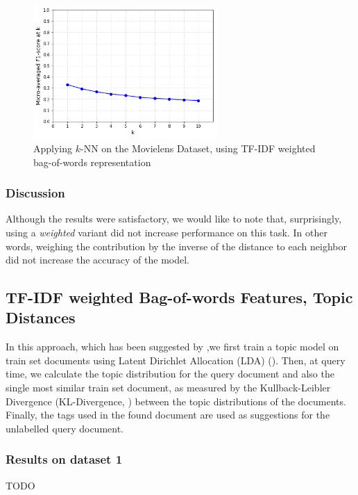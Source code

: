 \begin{figure}[H]
    \centering
    \includegraphics[width=7cm]{chapters/05_experiments/images/knn-tfidf-movielens.png}
    \caption{Applying $k$-NN on the Movielens Dataset, using TF-IDF weighted bag-of-words representation}
    \label{fig:knn__movielens}
\end{figure}

\subsubsection{Discussion}

Although the results were satisfactory, we would like to note that, surprisingly, using a \textit{weighted} variant did not increase performance on this task. In other words, weighing the contribution by the inverse of the distance to each neighbor did not increase the accuracy of the model.

\subsection{TF-IDF weighted Bag-of-words Features, Topic Distances}

In this approach, which has been suggested by \cite{choubey_2011},we first train a topic model on train set documents using Latent Dirichlet Allocation (LDA) (\cite{blei_etal_2003}). Then, at query time, we calculate the topic distribution for the query document and also the single most similar train set document, as measured by the Kullback-Leibler Divergence (KL-Divergence, \cite{kullback_leibler_1951}) between the topic distributions of the documents. Finally, the tags used in the found document are used as suggestions for the unlabelled query document.

\subsubsection{Results on dataset 1}

{\color{red} TODO}


